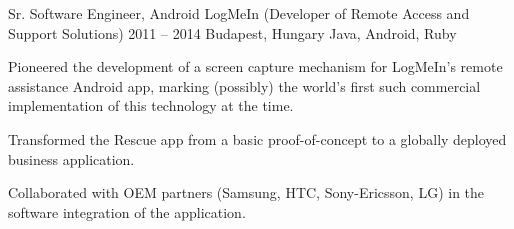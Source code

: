 \cvexperience
  {Sr. Software Engineer, Android}
  {LogMeIn (Developer of Remote Access and Support Solutions)}
  {2011 -- 2014}
  {Budapest, Hungary}
  {Java, Android, Ruby}
  {%
    \item Pioneered the development of a screen capture mechanism for LogMeIn's remote assistance Android app, marking (possibly) the world's first such commercial implementation of this technology at the time.
    \item Transformed the Rescue app from a basic proof-of-concept to a globally deployed business application.
    \item Collaborated with OEM partners (Samsung, HTC, Sony-Ericsson, LG) in the software integration of the application.
  }
